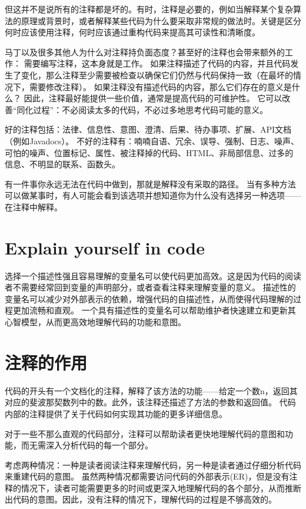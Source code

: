 \documentclass[]{ctexbook}
\begin{document}
但这并不是说所有的注释都是坏的。有时，注释是必要的，例如当解释某个复杂算法的原理或背景时，或者解释某些代码为什么要采取非常规的做法时。关键是区分何时应该使用注释，何时应该通过重构代码来提高其可读性和清晰度。

马丁以及很多其他人为什么对注释持负面态度？甚至好的注释也会带来额外的工作：
需要编写注释，这本身就是工作。
如果注释描述了代码的内容，并且代码发生了变化，那么注释至少需要被检查以确保它们仍然与代码保持一致（在最坏的情况下，需要修改注释）。
如果注释没有描述代码的内容，那么它们存在的意义是什么？
因此，注释最好能提供一些价值，通常是提高代码的可维护性。
它可以改善“同化过程”：不必阅读太多的代码，不必过多地思考代码可能的意义。

好的注释包括：法律、信息性、意图、澄清、后果、待办事项、扩展、API文档（例如Javadocs）。
不好的注释有：喃喃自语、冗余、误导、强制、日志、噪声、可怕的噪声、位置标记、属性、被注释掉的代码、HTML、非局部信息、过多的信息、不明显的联系、函数头。

有一件事你永远无法在代码中做到，那就是解释没有采取的路径。
当有多种方法可以做某事时，有人可能会看到该选项并想知道你为什么没有选择另一种选项——在注释中解释。

\section{Explain yourself in code}
选择一个描述性强且容易理解的变量名可以使代码更加高效。这是因为代码的阅读者不需要经常回到变量的声明部分，或者查看注释来理解变量的意义。
描述性的变量名可以减少对外部表示的依赖，增强代码的自描述性，从而使得代码理解的过程更加流畅和直观。
一个具有描述性的变量名可以帮助维护者快速建立和更新其心智模型，从而更高效地理解代码的功能和意图。

\section{注释的作用}
代码的开头有一个文档化的注释，解释了该方法的功能——给定一个数n，返回其对应的斐波那契数列中的数。此外，该注释还描述了方法的参数和返回值。
代码内部的注释提供了关于代码如何实现其功能的更多详细信息。

对于一些不那么直观的代码部分，注释可以帮助读者更快地理解代码的意图和功能，而无需深入分析代码的每一个部分。

考虑两种情况：一种是读者阅读注释来理解代码，另一种是读者通过仔细分析代码来重建代码的意图。
虽然两种情况都需要访问代码的外部表示(ER)，但是没有注释的情况下，读者可能需要更多的时间或更深入地理解代码的各个部分，从而推断出代码的意图。因此，没有注释的情况下，理解代码的过程是不够高效的。
\end{document}
